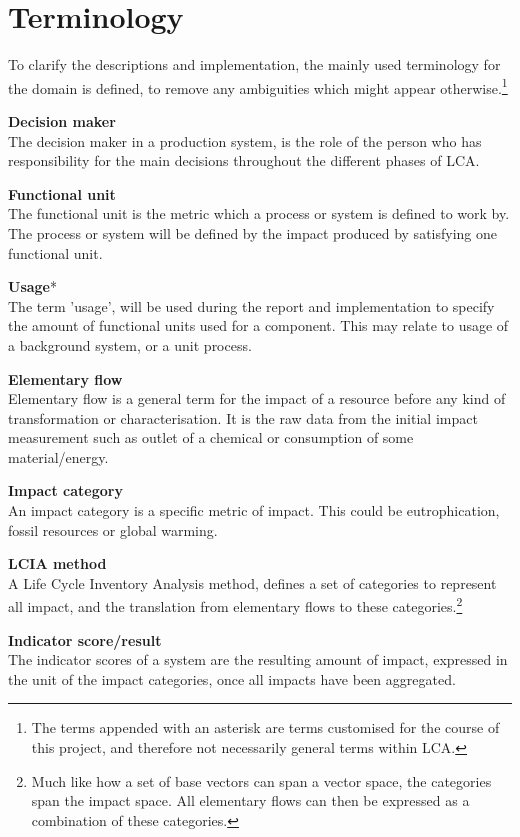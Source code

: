\section{Terminology} \label{sec:Terminology}

To clarify the descriptions and implementation, the mainly used terminology for the domain is defined, to remove any ambiguities which might appear otherwise.\footnote{The terms appended with an asterisk are terms customised for the course of this project, and therefore not necessarily general terms within LCA.}

\textbf{Decision maker}\\
The decision maker in a production system, is the role of the person who has responsibility for the main decisions throughout the different phases of LCA.

\textbf{Functional unit}\\
The functional unit is the metric which a process or system is defined to work by. The process or system will be defined by the impact produced by satisfying one functional unit.

\textbf{Usage}*\\
The term 'usage', will be used during the report and implementation to specify the amount of functional units used for a component. This may relate to usage of a background system, or a unit process.

\textbf{Elementary flow}\\
Elementary flow is a general term for the impact of a resource before any kind of transformation or characterisation. It is the raw data from the initial impact measurement such as outlet of a chemical or consumption of some material/energy.

\textbf{Impact category}\\
An impact category is a specific metric of impact. This could be eutrophication, fossil resources or global warming. 

\textbf{LCIA method}\\
A Life Cycle Inventory Analysis method, defines a set of categories to represent all impact, and the translation from elementary flows to these categories.\footnote{Much like how a set of base vectors can span a vector space, the categories span the impact space. All elementary flows can then be expressed as a combination of these categories.}

\textbf{Indicator score/result}\\
The indicator scores of a system are the resulting amount of impact, expressed in the unit of the impact categories, once all impacts have been aggregated.

